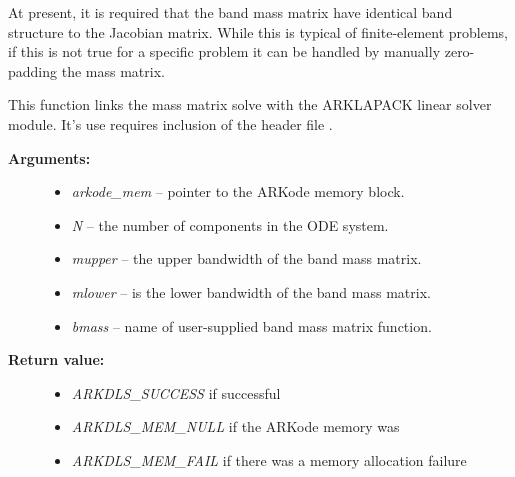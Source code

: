 \documentclass[letterpaper,10pt,english]{sphinxmanual}
\begin{document}
\begin{fulllineitems}
At present, it is required that the band mass matrix have identical
band structure to the Jacobian matrix.  While this is typical of
finite-element problems, if this is not true for a specific problem
it can be handled by manually zero-padding the mass matrix.

\end{fulllineitems}


\begin{fulllineitems}
\label{c_interface/User_callable:ARKMassLapackBand}
This function links the mass matrix solve with the ARKLAPACK linear
solver module.  It's use requires inclusion of the header file
.
\begin{description}
\item[{\textbf{Arguments:}}] \leavevmode\begin{itemize}
\item {} 
\emph{arkode\_mem} -- pointer to the ARKode memory block.

\item {} 
\emph{N} -- the number of components in the ODE system.

\item {} 
\emph{mupper} -- the upper bandwidth of the band mass matrix.

\item {} 
\emph{mlower} -- is the lower bandwidth of the band mass matrix.

\item {} 
\emph{bmass} -- name of user-supplied band mass matrix function.

\end{itemize}

\item[{\textbf{Return value:}}] \leavevmode\begin{itemize}
\item {} 
\emph{ARKDLS\_SUCCESS}   if successful

\item {} 
\emph{ARKDLS\_MEM\_NULL}  if the ARKode memory was 

\item {} 
\emph{ARKDLS\_MEM\_FAIL}  if there was a memory allocation failure


\end{itemize}
\end{description}
\end{fulllineitems}
\end{document}
